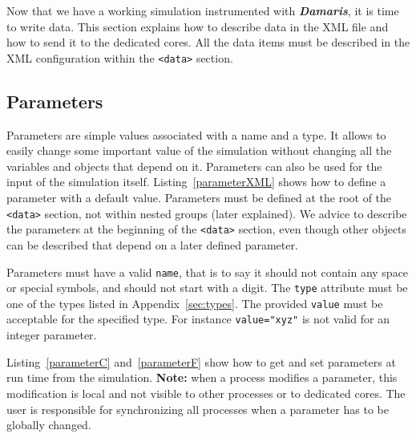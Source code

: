 \documentclass[11pt]{report}
\newcommand{\Damaris}{\emph{\textbf{Damaris}}}
\begin{document}
Now that we have a working simulation instrumented with \Damaris{}, it is time to write data.
This section explains how to describe data in the XML file and how to send it to the dedicated cores.
All the data items must be described in the XML configuration within the \texttt{<data>} section.

\subsection{Parameters}

Parameters are simple values associated with a name and a type. It allows to
easily change some important value of the simulation without changing all the variables
and objects that depend on it. Parameters can also be used for the input of the simulation itself. 
Listing~\ref{parameterXML} shows how to define a parameter with a default value.
Parameters must be defined at the root of the \texttt{<data>}  section, not within nested groups
(later explained). We advice to describe the parameters at the beginning of the \texttt{<data>}  section,
even though other objects can be described that depend on a later defined parameter.

\noindent\begin{minipage}{\textwidth}
\vspace{0.5cm}

\end{minipage}

Parameters must have a valid \texttt{name}, that is to say it should not contain any space or special symbols,
and should not start with a digit. The \texttt{type} attribute must be one of the types listed in 
Appendix~\ref{sec:types}. The provided \texttt{value} must be acceptable for the specified type. For instance
\texttt{value="xyz"} is not valid for an integer parameter.

Listing~\ref{parameterC} and~\ref{parameterF} show how to get and set parameters at run time
from the simulation. \textbf{Note:} when a process modifies a parameter, this modification is local and
not visible to other processes or to dedicated cores. The user is responsible for synchronizing all
processes when a parameter has to be globally changed.

\noindent\begin{minipage}{\textwidth}
\vspace{0.5cm}

\end{minipage}
\end{document}

